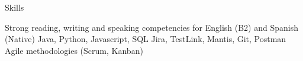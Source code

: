\begin{rubric}{Skills}

\entry*[Languages]
	Strong reading, writing and speaking competencies for English (B2) and Spanish (Native)
\entry*[Coding]
	Java, Python, Javascript, SQL
\entry*[Tooling]
	Jira, TestLink, Mantis, Git, Postman
\entry*[Misc.]
	Agile methodologies (Scrum, Kanban)
\end{rubric}
